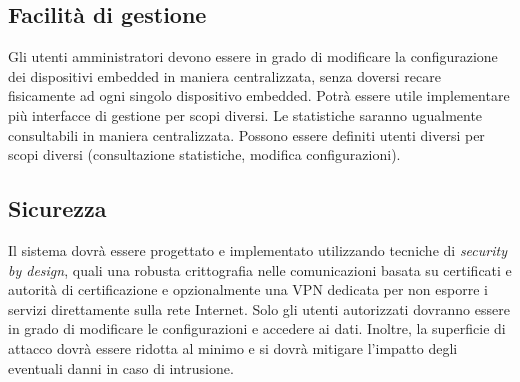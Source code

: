 \subsection{Facilità di gestione}
Gli utenti amministratori devono essere in grado di modificare la configurazione dei dispositivi embedded in maniera centralizzata, senza doversi recare fisicamente ad ogni singolo dispositivo embedded.
Potrà essere utile implementare più interfacce di gestione per scopi diversi.
Le statistiche saranno ugualmente consultabili in maniera centralizzata.
Possono essere definiti utenti diversi per scopi diversi (consultazione statistiche, modifica configurazioni).

\subsection{Sicurezza}
Il sistema dovrà essere progettato e implementato utilizzando tecniche di \textit{security by design}, quali una robusta crittografia nelle comunicazioni basata su certificati e autorità di certificazione e opzionalmente una VPN dedicata per non esporre i servizi direttamente sulla rete Internet.
Solo gli utenti autorizzati dovranno essere in grado di modificare le configurazioni e accedere ai dati.
Inoltre, la superficie di attacco dovrà essere ridotta al minimo e si dovrà mitigare l'impatto degli eventuali danni in caso di intrusione.

